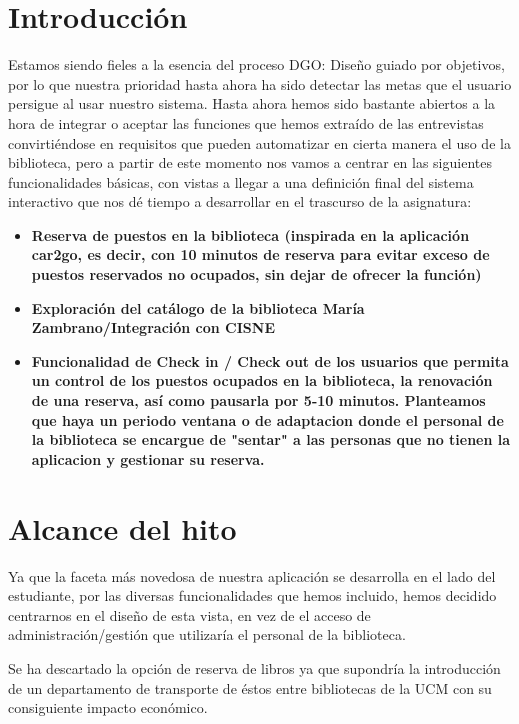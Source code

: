 \documentclass[12pt]{article}
\begin{document}
\section{Introducción}

Estamos siendo fieles a la esencia del proceso DGO: Diseño guiado por objetivos, por lo que nuestra prioridad hasta ahora ha sido detectar las metas que el usuario persigue al usar nuestro sistema. Hasta ahora hemos sido bastante abiertos a la hora de integrar o aceptar las funciones que hemos extraído de las entrevistas convirtiéndose en requisitos que pueden automatizar en cierta manera el uso de la biblioteca, pero a partir de este momento nos vamos a centrar en las siguientes funcionalidades básicas, con vistas a llegar a una definición final del sistema interactivo que nos dé tiempo a desarrollar en el trascurso de la asignatura:

\begin{itemize}

\item \textbf{Reserva de puestos en la biblioteca (inspirada en la aplicación car2go, es decir, con 10 minutos de reserva para evitar exceso de puestos reservados no ocupados, sin dejar de ofrecer la función)}
\item \textbf{Exploración del catálogo de la biblioteca María Zambrano/Integración con CISNE}
\item \textbf{Funcionalidad de Check in / Check out de los usuarios que permita un control de los puestos ocupados en la biblioteca, la renovación de una reserva, así como pausarla por 5-10 minutos. Planteamos que haya un periodo ventana o de adaptacion donde el personal de la biblioteca se encargue de "sentar" a las personas que no tienen la aplicacion y gestionar su reserva.}

\end{itemize}

\section{Alcance del hito}
Ya que la faceta más novedosa de nuestra aplicación se desarrolla en el lado del estudiante, por las diversas funcionalidades que hemos incluido, hemos decidido centrarnos en el diseño de esta vista, en vez de el acceso de administración/gestión que utilizaría el personal de la biblioteca.

Se ha descartado la opción de reserva de libros ya que supondría la introducción de un departamento de transporte de éstos entre bibliotecas de la UCM con su consiguiente impacto económico.
\end{document}
